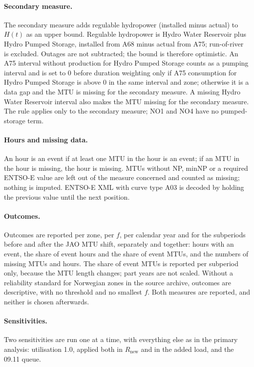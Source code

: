 \paragraph{Secondary measure.}
The secondary measure adds regulable hydropower (installed minus actual) to $H(t)$ as an upper bound. %
Regulable hydropower is Hydro Water Reservoir plus Hydro Pumped Storage, installed from A68 minus actual from A75; run-of-river is excluded. %
Outages are not subtracted; the bound is therefore optimistic. %
An A75 interval without production for Hydro Pumped Storage counts as a pumping interval and is set to 0 before duration weighting only if A75 consumption for Hydro Pumped Storage is above 0 in the same interval and zone; otherwise it is a data gap and the MTU is missing for the secondary measure. %
A missing Hydro Water Reservoir interval also makes the MTU missing for the secondary measure. %
The rule applies only to the secondary measure; NO1 and NO4 have no pumped-storage term. %

\paragraph{Hours and missing data.}
An hour is an event if at least one MTU in the hour is an event; if an MTU in the hour is missing, the hour is missing. %
MTUs without NP, minNP or a required ENTSO-E value are left out of the measure concerned and counted as missing; nothing is imputed. %
ENTSO-E XML with curve type A03 is decoded by holding the previous value until the next position. %

\paragraph{Outcomes.}
Outcomes are reported per zone, per $f$, per calendar year and for the subperiods before and after the JAO MTU shift, separately and together: hours with an event, the share of event hours and the share of event MTUs, and the numbers of missing MTUs and hours. %
The share of event MTUs is reported per subperiod only, because the MTU length changes; part years are not scaled. %
Without a reliability standard for Norwegian zones in the source archive, outcomes are descriptive, with no threshold and no smallest $f$. %
Both measures are reported, and neither is chosen afterwards. %

\paragraph{Sensitivities.}
Two sensitivities are run one at a time, with everything else as in the primary analysis: utilisation 1.0, applied both in $R_{\mathrm{new}}$ and in the added load, and the 09.11 queue. %

